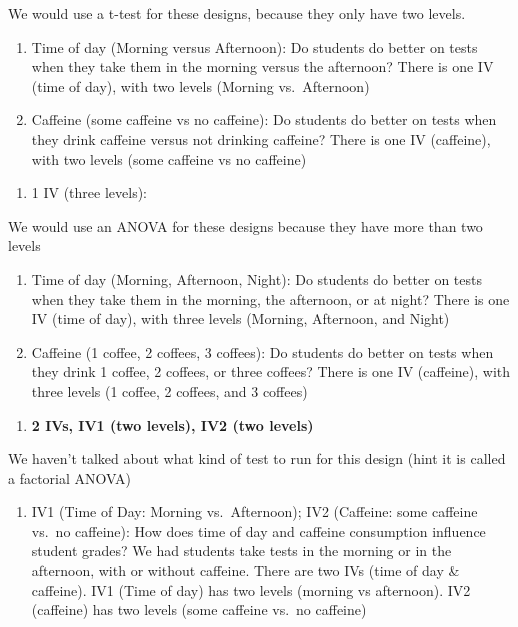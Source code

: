 \documentclass[
]{book}
\providecommand{\tightlist}{%
  \setlength{\itemsep}{0pt}\setlength{\parskip}{0pt}}
\begin{document}
We would use a t-test for these designs, because they only have two levels.

\begin{enumerate}
\def\labelenumi{\alph{enumi}.}
\item
  Time of day (Morning versus Afternoon): Do students do better on tests when they take them in the morning versus the afternoon? There is one IV (time of day), with two levels (Morning vs.~Afternoon)
\item
  Caffeine (some caffeine vs no caffeine): Do students do better on tests when they drink caffeine versus not drinking caffeine? There is one IV (caffeine), with two levels (some caffeine vs no caffeine)
\end{enumerate}

\begin{enumerate}
\def\labelenumi{\arabic{enumi}.}
\setcounter{enumi}{1}
\tightlist
\item
  1 IV (three levels):
\end{enumerate}

We would use an ANOVA for these designs because they have more than two levels

\begin{enumerate}
\def\labelenumi{\alph{enumi}.}
\item
  Time of day (Morning, Afternoon, Night): Do students do better on tests when they take them in the morning, the afternoon, or at night? There is one IV (time of day), with three levels (Morning, Afternoon, and Night)
\item
  Caffeine (1 coffee, 2 coffees, 3 coffees): Do students do better on tests when they drink 1 coffee, 2 coffees, or three coffees? There is one IV (caffeine), with three levels (1 coffee, 2 coffees, and 3 coffees)
\end{enumerate}

\begin{enumerate}
\def\labelenumi{\arabic{enumi}.}
\setcounter{enumi}{2}
\tightlist
\item
  \textbf{2 IVs, IV1 (two levels), IV2 (two levels)}
\end{enumerate}

We haven't talked about what kind of test to run for this design (hint it is called a factorial ANOVA)

\begin{enumerate}
\def\labelenumi{\alph{enumi}.}
\tightlist
\item
  IV1 (Time of Day: Morning vs.~Afternoon); IV2 (Caffeine: some caffeine vs.~no caffeine): How does time of day and caffeine consumption influence student grades? We had students take tests in the morning or in the afternoon, with or without caffeine. There are two IVs (time of day \& caffeine). IV1 (Time of day) has two levels (morning vs afternoon). IV2 (caffeine) has two levels (some caffeine vs.~no caffeine)
\end{enumerate}
\end{document}
